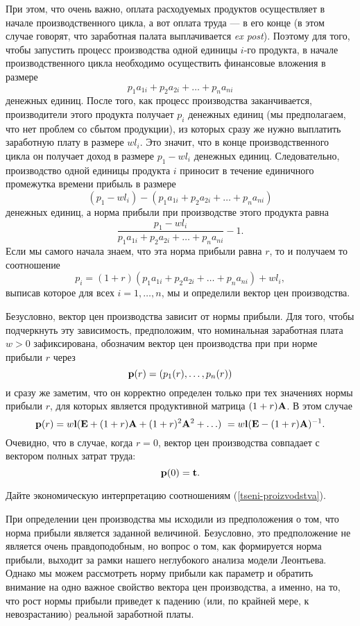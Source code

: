     При этом, что очень важно, оплата
    расходуемых продуктов осуществляет в начале производственного
    цикла, а вот оплата труда --- в его конце (в этом случае говорят,
    что заработная палата выплачивается \emph{ex post}). Поэтому для того,
    чтобы запустить процесс производства одной единицы $i$-го продукта,
    в начале производственного цикла
    необходимо  осуществить финансовые  вложения в размере
    \[p_{1}a_{1i}  +  p_{2}a_{2i}  +  \ldots  +  p_{n}a_{ni}\]
    денежных единиц. После того, как процесс производства
    заканчивается, производители этого продукта получает $p_{i}$ денежных
    единиц (мы предполагаем, что нет
    проблем со сбытом продукции),  из которых сразу же нужно выплатить заработную плату в
    размере $wl_{i}$. Это значит, что в конце
    производственного цикла он получает доход в размере
    $p_{1}-wl_{i}$ денежных единиц.
     Следовательно, производство одной единицы
    продукта $i$ приносит в течение единичного промежутка времени
    прибыль в размере
    \[(p_{1}-wl_{i})-(p_{1}a_{1i}  +  p_{2}a_{2i}  +  \ldots  +  p_{n}a_{ni})\]
    денежных единиц, а норма прибыли при производстве этого продукта
    равна
    \[\frac{p_{1}-wl_{i}}{p_{1}a_{1i}  +  p_{2}a_{2i}  +  \ldots  +  p_{n}a_{ni}}-1.\]
    Если мы самого начала знаем, что эта норма прибыли равна $r$, то
    и получаем то соотношение
    \[p_{i}=(1+r)(p_{1}a_{1i}+p_{2}a_{2i}+\ldots+p_{n}a_{ni})+wl_{i},\]
    выписав которое для всех $i=1,\ldots,n$, мы и определили вектор
    цен производства.

    Безусловно, вектор цен производства зависит от нормы прибыли. Для того,
    чтобы подчеркнуть эту зависимость, предположим, что номинальная заработная
    плата $w>0$ зафиксирована, обозначим вектор цен
    производства при при норме прибыли  $r$ через
    \[\mathbf{p}(r)=(p_{1}(r),\ldots,p_{n}(r))\]
    и сразу же заметим, что он корректно определен только при тех
    значениях нормы прибыли $r$, для которых является продуктивной
    матрица $(1+r)\mathbf{A}$. В этом случае
\begin{equation}
\label{tseni-proizvodstva}
    \mathbf{p}(r)=w\mathbf{l}(\mathbf{E}+(1+r)\mathbf{A}+(1+r)^{2}\mathbf{A}^{2}+\ldots) \
    =  w\mathbf{l}(\mathbf{E}-(1+r)\mathbf{A})^{-1}.
\end{equation}
    Очевидно, что в случае, когда $r=0$, вектор цен производства
    совпадает с вектором полных затрат труда:
    \[\mathbf{p}(0)=\mathbf{t}.\]
\begin{exer}
    Дайте экономическую интерпретацию соотношениям
    (\ref{tseni-proizvodstva}).
\end{exer}
    При определении цен производства мы исходили из предположения о
    том, что норма прибыли является заданной величиной. Безусловно,
    это предположение не является очень правдоподобным, но
    вопрос о том, как формируется норма прибыли, выходит за
    рамки нашего неглубокого анализа модели Леонтьева. Однако мы можем
    рассмотреть норму прибыли как параметр и обратить внимание на
    одно важное свойство вектора цен производства, а именно, на то, что
    рост нормы прибыли приведет к падению (или, по крайней мере, к невозрастанию)
     реальной заработной платы.



